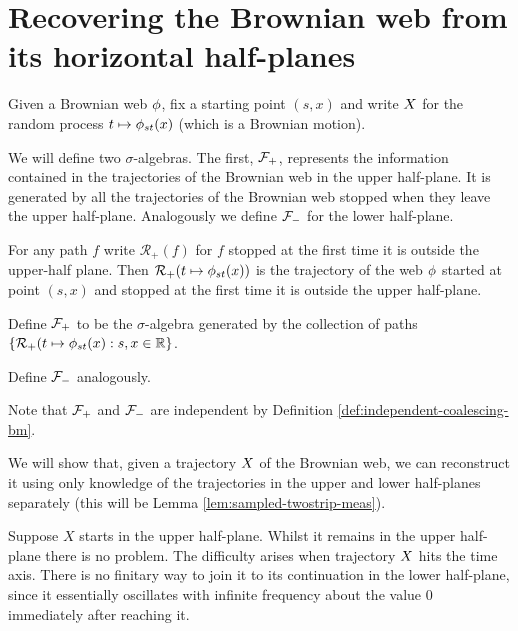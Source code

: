 {
\section{Recovering the Brownian web from its horizontal half-planes}

\begin{notation}
Given a Brownian web $\phi$, fix a starting point $(s,x)$ and write
$X$ for the random process $t \mapsto \phi_{{s}{t}}(x)$
(which is a Brownian motion).
\end{notation}

\newcommand{\restrictupper}{\mathcal{R}_{+}}

We will define two $\sigma$-algebras.  The first, $\mathcal{F}_{+}$,
represents the information contained in the trajectories of the
Brownian web in the upper half-plane.  It is generated by all the
trajectories of the Brownian web stopped when they leave the upper
half-plane.  Analogously we define $\mathcal{F}_{-}$ for the lower
half-plane.

\begin{definition}
  For any path $f$ write $\restrictupper(f)$ for $f$ stopped at the
  first time it is outside the upper-half plane.  Then
  $\restrictupper(t \mapsto \web{s}{t}{x})$ is the trajectory of the
  web $\phi$ started at point $(s,x)$ and stopped at the first
  time it is outside the upper half-plane.

  Define $\mathcal{F}_{+}$ to be the $\sigma$-algebra generated by the
  collection of paths $\{\restrictupper(t \mapsto \web{s}{t}{x} : s,x
  \in \R \}$.

  Define $\mathcal{F}_{-}$ analogously.
\end{definition}

\begin{observation}
  Note that $\mathcal{F}_{+}$ and $\mathcal{F}_{-}$ are independent by Definition
  \ref{def:independent-coalescing-bm}.
\end{observation}

We will show that, given a trajectory $X$ of the Brownian web,
we can reconstruct it using only knowledge of the trajectories in the
upper and lower half-planes separately (this will be Lemma
\ref{lem:sampled-twostrip-meas}).

Suppose $X$ starts in the upper half-plane.  Whilst it remains in the upper
half-plane there is no problem.
The difficulty arises when trajectory $X$
hits the time axis.  There is no finitary way to join
it to its continuation in the lower half-plane, since it essentially
oscillates with infinite frequency about the value $0$ immediately
after reaching it.

}
